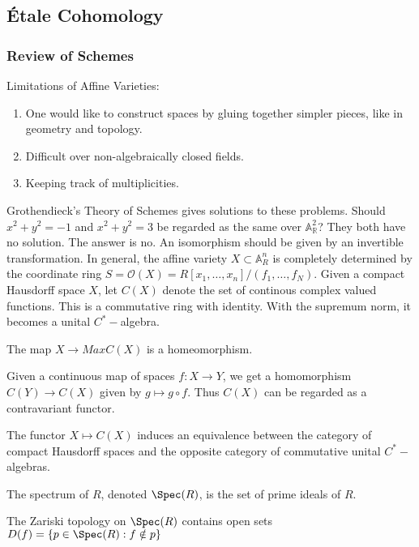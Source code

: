 \documentclass[crop=false,class=book,oneside]{standalone}
\begin{document}
\subsection{\'{E}tale Cohomology}
\subsubsection{Review of Schemes}
\begin{remark}
Limitations of Affine Varieties:
\begin{enumerate}
    \item One would like to construct spaces by gluing together simpler pieces, like in geometry and topology.
    \item Difficult over non-algebraically closed fields.
    \item Keeping track of multiplicities.
\end{enumerate}
\end{remark}
Grothendieck's Theory of Schemes gives solutions to these problems. Should $x^{2}+y^{2}=-1$ and $x^{2}+y^{2}=3$ be regarded as the same over $\mathbb{A}_{\mathbb{R}}^{2}$? They both have no solution. The answer is no. An isomorphism should be given by an invertible transformation. In general, the affine variety $X\subset \mathbb{A}_{R}^n$ is completely determined by the coordinate ring $S = \mathcal{O}(X) = R[x_1,\hdots, x_n]/(f_1,\hdots, f_N)$. Given a compact Hausdorff space $X$, let $C(X)$ denote the set of continous complex valued functions. This is a commutative ring with identity. With the supremum norm, it becomes a unital $C^{*}-$algebra.
\begin{theorem}
The map $X\rightarrow MaxC(X)$ is a homeomorphism.
\end{theorem}
Given a continuous map of spaces $f:X\rightarrow Y$, we get a homomorphism $C(Y)\rightarrow C(X)$ given by $g\mapsto g\circ f$. Thus $C(X)$ can be regarded as a contravariant functor. 
\begin{theorem}[Gelfand]
The functor $X\mapsto C(X)$ induces an equivalence between the category of compact Hausdorff spaces and the opposite category of commutative unital $C^{*}-$algebras.
\end{theorem}
\begin{definition}
The spectrum of $R$, denoted $\Spec(R)$, is the set of prime ideals of $R$.
\end{definition}
\begin{theorem}
The Zariski topology on $\Spec(R)$ contains open sets $D(f)=\{p\in\Spec(R):f\notin p\}$
\end{theorem}
\end{document}
